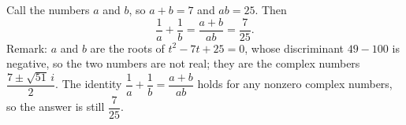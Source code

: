 Call the numbers $a$ and $b$, so $a+b=7$ and $ab=25$. Then
\[
\dfrac{1}{a}+\dfrac{1}{b}=\dfrac{a+b}{ab}=\boxed{\dfrac{7}{25}} .
\]
Remark: $a$ and $b$ are the roots of $t^2-7t+25=0$, whose discriminant $49-100$ is negative, so the two numbers are not real; they are the complex numbers $\dfrac{7\pm\sqrt{51}\,i}{2}$. The identity $\dfrac{1}{a}+\dfrac{1}{b}=\dfrac{a+b}{ab}$ holds for any nonzero complex numbers, so the answer is still $\dfrac{7}{25}$.
